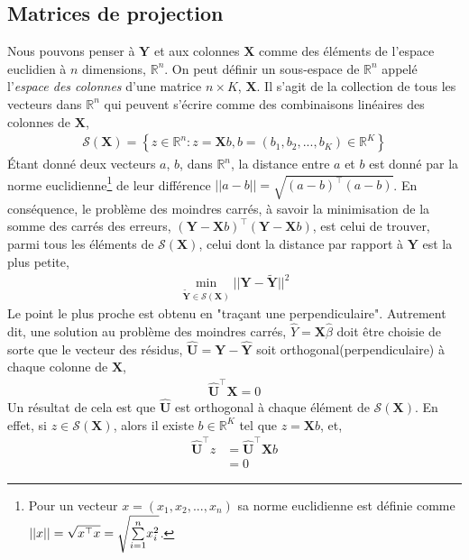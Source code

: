 \subsection{Matrices de projection}
Nous pouvons penser à $\mathbf{Y}$ et aux colonnes $\mathbf{X}$ comme des éléments de l'espace euclidien à $n$ dimensions, $\mathbb{R}^n$. On peut définir un sous-espace de $\mathbb{R}^n$ appelé l'\emph{espace des colonnes} d'une matrice $n\times K$, $\mathbf{X}$. Il s'agit de la collection de tous les vecteurs dans $\mathbb{R}^n$ qui peuvent s'écrire comme des combinaisons linéaires des colonnes de $\mathbf{X}$,
\begin{align*}
\mathcal{S}(\mathbf{X}) = \left\{z \in \mathbb{R}^n: z = \mathbf{X}b, b = (b_1, b_2,...,b_K) \in \mathbb{R}^K  \right\}
\end{align*}
\'Etant donné deux vecteurs $a$, $b$, dans $\mathbb{R}^n$, la distance entre $a$ et $b$ est donné par la norme euclidienne\footnote{Pour un vecteur $x=(x_1, x_2,...,x_n)$ sa norme euclidienne est définie comme $||x|| = \sqrt{x^\top x} = \sqrt{\underset{i=1}{\overset{n}{\sum}} x_i^2}$.} de leur différence $||a-b|| = \sqrt{(a-b)^\top(a-b)}$. En conséquence, le problème des moindres carrés, à savoir la minimisation de la somme des carrés des erreurs, $(\mathbf{Y}-\mathbf{X}b)^\top(\mathbf{Y}-\mathbf{X}b)$, est celui de trouver, parmi tous les éléments de $\mathcal{S}(\mathbf{X})$, celui dont la distance par rapport à $\mathbf{Y}$ est la plus petite,
\begin{align*}
\underset{\tilde{\mathbf{Y}}\in \mathcal{S}(\mathbf{X})}{\min} ||\mathbf{Y} - \tilde{\mathbf{Y}}||^2
\end{align*}
Le point le plus proche est obtenu en "traçant une perpendiculaire". Autrement dit, une solution au problème des moindres carrés, $\widehat{Y} = \mathbf{X}\widehat{\beta}$ doit être choisie de sorte que le vecteur des résidus, $\widehat{\mathbf{U}} = \mathbf{Y}-\widehat{\mathbf{Y}}$ soit orthogonal(perpendiculaire) à chaque colonne de $\mathbf{X}$,
\begin{align*}
\widehat{\mathbf{U}}^\top\mathbf{X} = 0
\end{align*}
Un  résultat de cela est que $\widehat{\mathbf{U}}$ est orthogonal à chaque élément de $\mathcal{S}(\mathbf{X})$. En effet, si $z\in \mathcal{S}(\mathbf{X})$, alors il existe $b\in\mathbb{R}^K$ tel que $z=\mathbf{X}b$, et,
\begin{align*}
\widehat{\mathbf{U}}^\top z &= \widehat{\mathbf{U}}^\top\mathbf{X}b\\
& = 0
\end{align*}
